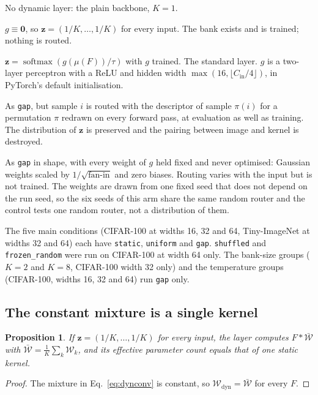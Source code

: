 \documentclass[10pt,a4paper]{article}
\newtheorem{proposition}{Proposition}
\newcommand{\zv}{\mathbf{z}}
\begin{document}
\begin{description}\setlength\itemsep{2pt}
\item[\texttt{static}] No dynamic layer: the plain backbone, $K=1$.
\item[\texttt{uniform}] $g\equiv\mathbf{0}$, so $\zv=(1/K,\dots,1/K)$ for
every input. The bank exists and is trained; nothing is routed.
\item[\texttt{gap}] $\zv=\operatorname{softmax}(g(\mu(F))/\tau)$ with $g$
trained. The standard layer. $g$ is a two-layer perceptron with a ReLU and
hidden width $\max(16,\lfloor C_{\text{in}}/4\rfloor)$, in PyTorch's default
initialisation.
\item[\texttt{shuffled}] As \texttt{gap}, but sample $i$ is routed with
the descriptor of sample $\pi(i)$ for a permutation $\pi$ redrawn on every
forward pass, at evaluation as well as training. The distribution of
$\zv$ is preserved and the pairing between image and kernel is
destroyed.
\item[\texttt{frozen\_random}] As \texttt{gap} in shape, with every weight
of $g$ held fixed and never optimised: Gaussian weights scaled by
$1/\sqrt{\text{fan-in}}$ and zero biases. Routing varies with the input but
is not trained. The weights are drawn from one fixed seed that does not
depend on the run seed, so the six seeds of this arm share the same random
router and the control tests one random router, not a distribution of them.
\end{description}
The five main conditions (CIFAR-100 at widths 16, 32 and 64,
Tiny-ImageNet at widths 32 and 64) each have \texttt{static},
\texttt{uniform} and \texttt{gap}. \texttt{shuffled} and
\texttt{frozen\_random} were run on CIFAR-100 at width 64 only. The
bank-size groups ($K=2$ and $K=8$, CIFAR-100 width 32 only) and the
temperature groups (CIFAR-100, widths 16, 32 and 64) run \texttt{gap} only.

\subsection{The constant mixture is a single kernel}

\begin{proposition}\label{prop:collapse}
If $\zv=(1/K,\dots,1/K)$ for every input, the layer computes
$F*\bar{\mathcal{W}}$ with $\bar{\mathcal{W}}=\tfrac1K\sum_k\mathcal{W}_k$,
and its effective parameter count equals that of one static kernel.
\end{proposition}
\begin{proof}
The mixture in Eq.~\eqref{eq:dynconv} is constant, so
$\mathcal{W}_{\text{dyn}}=\bar{\mathcal{W}}$ for every $F$.
\end{proof}
\end{document}
